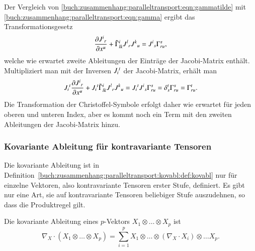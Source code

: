 Der Vergleich von
\eqref{buch:zusammenhang:paralleltransport:eqn:gammatilde}
mit
\eqref{buch:zusammenhang:paralleltransport:eqn:gamma}
ergibt das Transformationsgesetz
\begin{align*}
\frac{\partial J^i\mathstrut_r}{\partial x^u}
+
\tilde{\Gamma}^i_{lk}
J^l\mathstrut_r
J^k\mathstrut_u
=
J^i\mathstrut_s
\Gamma^s_{ru},
\end{align*}
welche wie erwartet zweite Ableitungen der Einträge der Jacobi-Matrix
enthält.
Multipliziert man mit der Inversen $J_i\mathstrut^t$ der Jacobi-Matrix,
erhält man
\begin{align*}
J_i\mathstrut^t
\frac{\partial J^i\mathstrut_r}{\partial x^u}
+
J_i\mathstrut^t
\tilde{\Gamma}^i_{lk}
J^l\mathstrut_r
J^k\mathstrut_u
=
J_i\mathstrut^t
J^i\mathstrut_s
\Gamma^s_{ru}
=
\delta^t_s
\Gamma^s_{ru}
=
\Gamma^t_{ru}.
\end{align*}
Die Transformation der Christoffel-Symbole erfolgt daher wie erwartet
für jeden oberen und unteren Index, aber es kommt noch ein Term mit
den zweiten Ableitungen der Jacobi-Matrix hinzu.

%
%
\subsubsection{Kovariante Ableitung für kontravariante Tensoren}
Die kovariante Ableitung ist in
Definition~\ref{buch:zusammenhang:paralleltransport:kovabl:def:kovabl}
nur für einzelne Vektoren, also kontravariante Tensoren erster Stufe,
definiert.
Es gibt nur eine Art, sie auf kontravariante Tensoren beliebiger Stufe
auszudehnen, so dass die Produktregel gilt.

\begin{definition}
Die kovariante Ableitung eines $p$-Vektors $X_1\otimes\dots\otimes X_p$
ist
\[
\nabla_X\cdot (X_1\otimes\dots\otimes X_p)
=
\sum_{i=1}^p
X_1\otimes\dots\otimes(\nabla_X\cdot X_i)\otimes\dots X_p.
\]
\end{definition}

